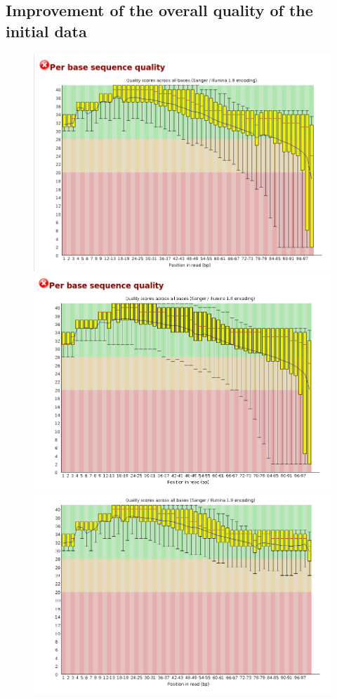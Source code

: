 \documentclass{article}
\begin{document}
 \subsection{Improvement of the overall quality of the initial data}
 \label{sec:supplement}
\begin{figure}[h]

\includegraphics[scale=0.35]{fow_prev_trim.png} 
\includegraphics[scale=0.35]{rev_prev_trim.png} \\
\includegraphics[scale=0.35]{fow_aft_trim.png}

\end{figure}
\end{document}
